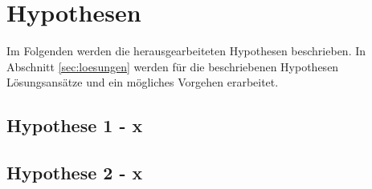 
\section{Hypothesen}
\label{sec:hypothesen}
Im Folgenden werden die herausgearbeiteten Hypothesen beschrieben. In Abschnitt \ref{sec:loesungen}
werden für die beschriebenen Hypothesen Lösungsansätze und ein mögliches Vorgehen erarbeitet.

\subsection{Hypothese 1 - x}

\subsection{Hypothese 2 - x}


